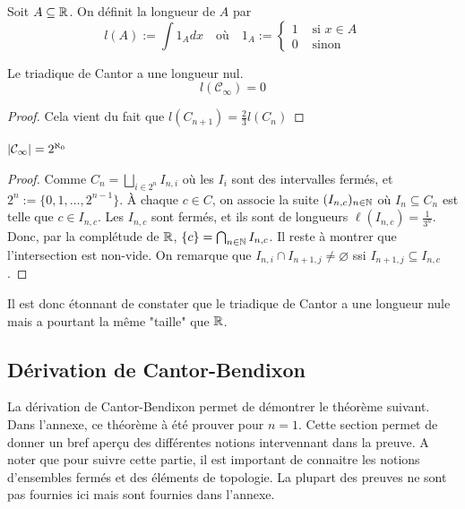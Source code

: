 \begin{definition}
    Soit $A\subseteq \mathbb{R}$. On définit la longueur de $A$ par 
    $$l(A):=\int1_Adx \quad \text{où} \quad1_A:=\begin{cases}
        1 &\text{ si }x\in A\\
        0 &\text{ sinon}
    \end{cases}$$
\end{definition}

\begin{proposition}
    Le triadique de Cantor a une longueur nul.
    \[
    l(\mathcal{C}_{\infty})=0
    \]
\end{proposition}

\begin{proof}
    Cela vient du fait que $l(C_{n+1})=\frac{2}{3}l(C_n)$
\end{proof}

\begin{theoreme}
    $\left| \mathcal{C}_{\infty} \right|=2^{\aleph_0}$
\end{theoreme}
\begin{proof}
    Comme $C_n=\bigsqcup_{i\in 2^n}I_{n,i}$ où les $I_i$ sont des intervalles fermés, et $2^n:=\{0,1,\dotsc,2^{n-1}\}$. À chaque $c\in C$, on associe la suite $(I_{n,c})_{n\in\mathbb{N}}$ où $I_n\subseteq C_n$ est telle que $c\in I_{n,c}$. Les $I_{n,c}$ sont fermés, et ils sont de longueurs $\ell(I_{n,c})=\frac 1{3^n}$. Donc, par la complétude de $\mathbb{R}$,  $\{c\}=\bigcap_{n\in\mathbb{N}}I_{n,c}$. Il reste à montrer que l'intersection est non-vide. On remarque que $I_{n,i}\cap I_{n+1,j}\ne\varnothing$ ssi $I_{n+1,j}\subseteq I_{n,c}$.
\end{proof}

Il est donc étonnant de constater que le triadique de Cantor a une longueur nule mais a pourtant la même "taille" que $\mathbb{R}$. 

\subsection{Dérivation de Cantor-Bendixon}

La dérivation de Cantor-Bendixon permet de démontrer le théorème suivant. Dans l'annexe, ce théorème à été prouver pour $n=1$. Cette section permet de donner un bref aperçu des différentes notions intervennant dans la preuve. A noter que pour suivre cette partie, il est important de connaitre les notions d'ensembles fermés et des éléments de topologie. La plupart des preuves ne sont pas fournies ici mais sont fournies dans l'annexe.

